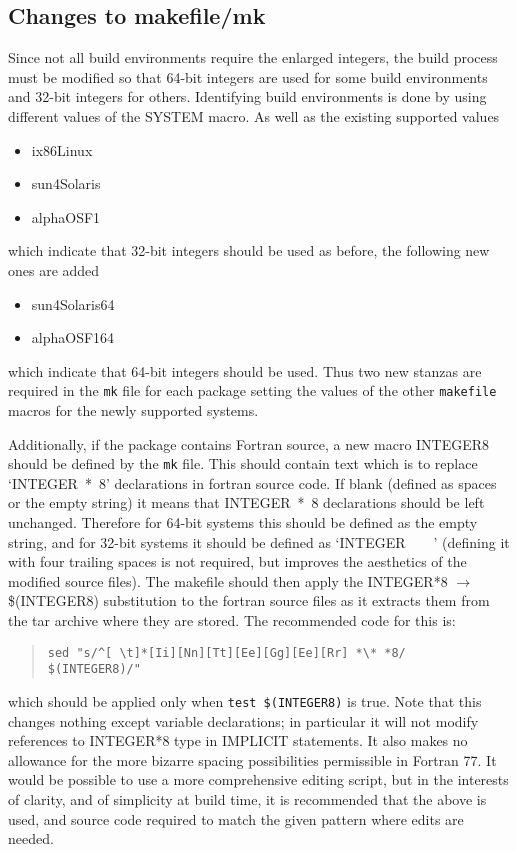 \documentclass[twoside,11pt]{article}
\newcommand{\latexhtml}[2]{#1}
\renewcommand{\_}{\texttt{\symbol{95}}}
\newcommand{\file}[1]{{\tt #1}}
\newenvironment{squote}{\begin{quote}\begin{small}}{\end{small}\end{quote}}
\begin{document}
\subsection{Changes to makefile/mk\label{sec:makefile}}

Since not all build environments require the enlarged integers,
the build process must be modified so that 64-bit integers are
used for some build environments and 32-bit integers for others.
Identifying build environments is done by using different values
of the SYSTEM macro.  As well as the existing supported values
\begin{itemize}
\item ix86\_Linux
\item sun4\_Solaris
\item alpha\_OSF1
\end{itemize}
which indicate that 32-bit integers should be used as before, 
the following new ones are added
\begin{itemize}
\item sun4\_Solaris\_64
\item alpha\_OSF1\_64
\end{itemize}
which indicate that 64-bit integers should be used.
Thus two new stanzas are required in the \file{mk} file for each package
setting the values of the other \file{makefile} macros for the newly
supported systems.  

Additionally, if the package contains Fortran source,
a new macro INTEGER8 should be 
defined by the \file{mk} file.  This should contain text which is to
replace `INTEGER~*~8' declarations in fortran source code.  
If blank (defined as spaces or the empty string) it means 
that INTEGER~*~8 declarations should be left unchanged.
Therefore for 64-bit systems this should be defined as the empty
string, and for 32-bit systems it should be defined as `INTEGER~~~~'
(defining it with four trailing spaces
is not required, but improves the aesthetics of
the modified source files).
The makefile should then apply the 
INTEGER*8 \latexhtml{$\rightarrow$}{->} \$(INTEGER8)
substitution to the fortran source files as it extracts them from the
tar archive where they are stored.
The recommended code for this is:
\begin{squote}
\begin{verbatim}
sed "s/^[ \t]*[Ii][Nn][Tt][Ee][Gg][Ee][Rr] *\* *8/      $(INTEGER8)/"
\end{verbatim}
\end{squote}
which should be applied only when {\tt test \$(INTEGER8)} is true.
Note that this changes nothing except variable declarations; 
in particular it will not modify references to INTEGER*8 type in IMPLICIT
statements.
It also makes no allowance for the more bizarre spacing possibilities
permissible in Fortran 77.
It would be possible to use a more comprehensive editing script,
but in the interests of clarity, and of simplicity at build time,
it is recommended that the above is used, 
and source code required to match the given pattern where edits
are needed.
\end{document}
